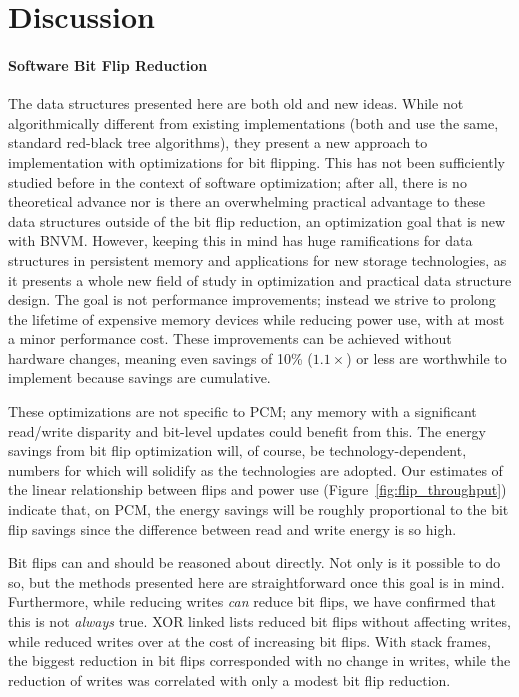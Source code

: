 \section{Discussion}
\label{sec:disc}

\paragraph{Software Bit Flip Reduction}

The data structures presented here are both old and new ideas. While not
algorithmically different from existing implementations (both \xrbt and \rbt use
the same, standard red-black tree algorithms), they present a new approach to
implementation with optimizations for bit flipping. This 
has not been sufficiently studied before in the context of software optimization;
after all, there is no theoretical advance nor is there an overwhelming
practical advantage to these data structures outside of the bit flip reduction,
an optimization goal that is new with BNVM. However, keeping this in mind has
huge ramifications for data structures in persistent memory and applications for
new storage technologies, as it presents a whole new field of
study in optimization and practical data structure design. The goal is
not performance improvements; instead we strive to prolong the lifetime of expensive
memory devices while reducing power use, with at most a minor
performance cost. These improvements can be achieved without hardware
changes, meaning even savings of 10\% ($1.1\times$) or
less are worthwhile to implement because savings are cumulative.

These optimizations are not specific to PCM; any memory with a significant read/write
disparity and bit-level updates could benefit from this. The energy savings from bit flip
optimization will, of course, be technology-dependent, numbers for which will solidify as the
technologies are adopted. Our estimates of the linear relationship
between flips and power use (Figure~\ref{fig:flip_throughput}) indicate that, on PCM, the energy
savings will be roughly proportional to the bit flip savings since the difference between read and
write energy is so high.

Bit flips can and should be reasoned about directly. Not only is it possible to
do so, but the methods presented here are straightforward once this goal is in mind.
Furthermore, while reducing writes \textit{can} reduce bit flips, we have
confirmed that this is not \textit{always} true. XOR linked lists reduced bit
flips without affecting writes, while \xrbt reduced writes over \xrbtbig
at the cost of increasing bit flips. With stack frames, the biggest reduction in bit flips
corresponded with no change in writes, while the reduction of writes was
correlated with only a modest bit flip reduction.

